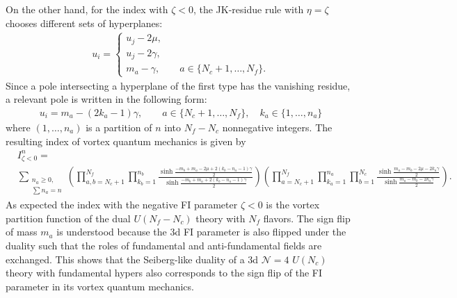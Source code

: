 \documentclass[a4paper,11pt]{article}
\begin{document}
On the other hand, for the index with $\zeta < 0$, the JK-residue rule with $\eta = \zeta$ chooses different sets of hyperplanes:
\begin{align}
u_i = \left\{\begin{array}{l}
u_j-2 \mu, \\
u_j-2 \gamma, \\
m_a-\gamma, \qquad a \in \{N_c+1,\ldots,N_f\}.
\end{array}\right.
\end{align}
Since a pole intersecting a hyperplane of the first type has the vanishing residue, a relevant pole is written in the following form:
\begin{align}
u_i = m_a-(2 k_a-1) \gamma, \qquad a \in \{N_c+1,\ldots,N_f\}, \quad k_a \in \{1,\ldots,n_a\}
\end{align}
where $(1,\ldots,n_a)$ is a partition of $n$ into $N_f-N_c$ nonnegative integers. The resulting index of vortex quantum mechanics is given by
\begin{align}
\label{eq:ind-}
%
& I^n_{\zeta < 0} = \nonumber \\
& \sum_{\substack{n_a \geq 0, \\ \sum n_a = n}} \left(\prod_{a,b = N_c+1}^{N_f} \prod_{k_b = 1}^{n_b} \frac{\sinh \frac{-m_b+m_a-2 \mu+2 (k_b-n_a-1) \gamma}{2}}{\sinh \frac{-m_b+m_a+2 (k_b-n_a-1) \gamma}{2}}\right) \left(\prod_{a = N_c+1}^{N_f} \prod_{k_a = 1}^{n_a} \prod_{b = 1}^{N_c} \frac{\sinh \frac{m_a-m_b-2 \mu-2 k_a \gamma}{2}}{\sinh \frac{m_a-m_b-2 k_a \gamma}{2}}\right).
%
\end{align}
As expected the index with the negative FI parameter $\zeta < 0$ is the vortex partition function of the dual $U(N_f-N_c)$ theory with $N_f$ flavors. The sign flip of mass $m_a$ is understood because the 3d FI parameter is also flipped under the duality such that the roles of fundamental and anti-fundamental fields are exchanged. This shows that the Seiberg-like duality of a 3d $\mathcal N = 4$ $U(N_c)$ theory with fundamental hypers also corresponds to the sign flip of the FI parameter in its vortex quantum mechanics.
\\
\end{document}
